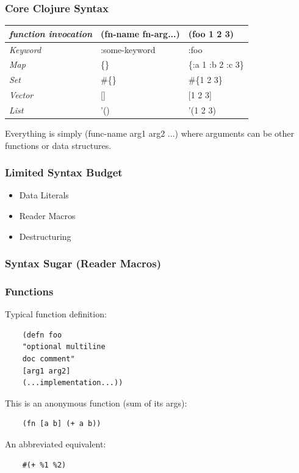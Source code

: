 \documentclass{beamer}
\begin{document}
\begin{frame}
  \frametitle{Core Clojure Syntax}
  \begin{tabularx}{\textwidth}{ |X|X|X| }
    \hline
    \emph{function invocation} & (fn-name fn-arg...)  &  (foo 1 2 3) \\ 
    \hline
    \emph{Keyword} & :some-keyword  & :foo \\ 
    \hline
    \emph{Map} &    \{\}  & \{:a 1 :b 2 :c 3\} \\ 
    \hline
    \emph{Set} &    \#\{\} & \#\{1 2 3\} \\ 
    \hline
    \emph{Vector} & []  & [1 2 3] \\
    \hline
    \emph{List} & '() & '(1 2 3) \\
    \hline
  \end{tabularx}

  \vspace{.5cm}
  Everything is simply (func-name arg1 arg2 ...) where arguments can
  be other functions or data structures. 
\end{frame}

\begin{frame}
  \frametitle{Limited Syntax Budget}
  \begin{itemize}
  \item Data Literals 
  \item Reader Macros
  \item Destructuring
  \end{itemize}
\end{frame}

\begin{frame}
  \frametitle{Syntax Sugar (Reader Macros)}
\end{frame}

\begin{frame}[fragile]
  \frametitle{Functions}
  Typical function definition:
  \begin{verbatim}
    (defn foo 
    "optional multiline 
    doc comment" 
    [arg1 arg2]
    (...implementation...))
  \end{verbatim}
  \vspace{1 cm}

  This is an anonymous function (sum of its args):
  \begin{verbatim}
    (fn [a b] (+ a b))   
  \end{verbatim}
  \vspace{1 cm}

  An abbreviated equivalent:
  \begin{verbatim}
    #(+ %1 %2)
  \end{verbatim}
\end{frame}
\end{document}
